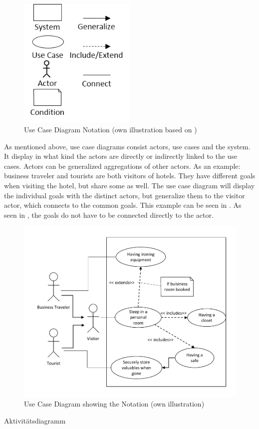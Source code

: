 \paragraph{} 
\begin{figure}
    \centering
    \includegraphics[width=0.5\textwidth]{img/ucSymb.png}
    \caption[Use Case Diagram Notation]{Use Case Diagram Notation (own illustration based on \cite[163]{Pohl.2007})}
    \label{fig:ucSymb}
\end{figure}
As mentioned above, use case diagrams consist actors, use cases and the system. It display in what kind the actors are directly or indirectly linked to the use cases. Actors can be generalized aggregations of other actors. As an example: business traveler and tourists are both visitors of hotels. They have different goals when visiting the hotel, but share some as well. The use case diagram will display the individual goals with the distinct actors, but generalize them to the visitor actor, which connects to the common goals. This example can be seen in . As seen in , the goals do not have to be connected directly to the actor.
\begin{figure}[H]
    \centering
    \includegraphics[scale=1]{img/ucEx.pdf}
    \caption[Example Use Case Diagram]{Use Case Diagram showing the Notation (own illustration)}
    \label{fig:ucEx}
\end{figure}
Aktivitätsdiagramm
\clearpage

